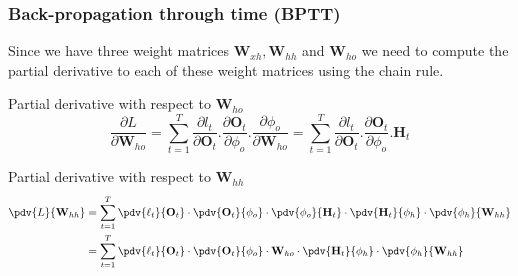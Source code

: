 \documentclass[11pt,]{beamer}
\begin{document}
\begin{frame}
	\frametitle{Back-propagation through time (BPTT)}

		Since we have three weight matrices $\mathbf{W}_{xh}, \mathbf{W}_{hh}$ and $\mathbf{W}_{ho}$ we need to
compute the partial derivative to each of these weight matrices using the
chain rule.
		\smallskip
        \begin{block}{Partial derivative with respect to $\mathbf{W}_{ho}$}
        \begin{equation*}
            \frac{\partial L}{\partial \mathbf{W}_{ho}} = \sum_{t=1}^{T}\frac{\partial l_t}{\partial \mathbf{O}_t}.\frac{\partial \mathbf{O}_t}{\partial \phi_o}.\frac{\partial \phi_o}{\partial \mathbf{W}_{ho}} = \sum_{t=1}^{T}\frac{\partial l_t}{\partial \mathbf{O}_t}.\frac{\partial \mathbf{O}_t}{\partial \phi_o}.\mathbf{H}_t
        \end{equation*}
		\end{block}
	\begin{block}{Partial derivative with respect to $\mathbf{W}_{hh}$}
        \begin{equation*}
			\begin{split}
            \pdv{L}{\mathbf{W}_{hh}} &= \sum_{t=1}^T \pdv{\ell_t}{\mathbf{O}_t} \cdot \pdv{\mathbf{O}_t}{\phi_o} \cdot \pdv{\phi_o}{\mathbf{H}_t} \cdot \pdv{\mathbf{H}_t}{\phi_h} \cdot \pdv{\phi_h}{\mathbf{W}_{hh}} \\
									 &= \sum_{t=1}^T \pdv{\ell_t}{\mathbf{O}_t} \cdot \pdv{\mathbf{O}_t}{\phi_o} \cdot \mathbf{W}_{ho} \cdot \pdv{\mathbf{H}_t}{\phi_h} \cdot \pdv{\phi_h}{\mathbf{W}_{hh}} 
			\end{split}
        \end{equation*}
	\end{block}

\end{frame}
\end{document}
